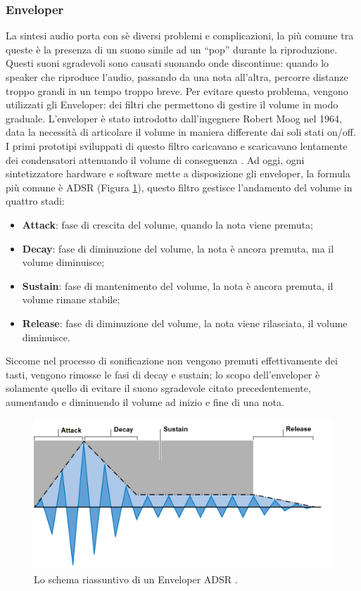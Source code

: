 \subsubsection{Enveloper}
La sintesi audio porta con sè diversi problemi e complicazioni, la più comune tra queste è la presenza di un suono simile ad un “pop” durante la riproduzione.
Questi suoni sgradevoli sono causati suonando onde discontinue: quando lo speaker che riproduce l'audio, passando da una nota all'altra, percorre distanze troppo grandi in un tempo troppo breve.
Per evitare questo problema, vengono utilizzati gli Enveloper: dei filtri che permettono di gestire il volume in modo graduale.
L'enveloper è stato introdotto dall'ingegnere Robert Moog nel 1964, data la necessità di articolare il volume in maniera differente dai soli stati on/off.
I primi prototipi sviluppati di questo filtro caricavano e scaricavano lentamente dei condensatori attenuando il volume di conseguenza \cite{enveloper}.
Ad oggi, ogni sintetizzatore hardware e software mette a disposizione gli enveloper, la formula più comune è ADSR (Figura \ref{fig:asdr}), questo filtro gestisce l'andamento del volume in quattro stadi:
\begin{itemize}
    \item \textbf{Attack}: fase di crescita del volume, quando la nota viene premuta;
    \item \textbf{Decay}: fase di diminuzione del volume, la nota è ancora premuta, ma il volume diminuisce;
    \item \textbf{Sustain}: fase di mantenimento del volume, la nota è ancora premuta, il volume rimane stabile;
    \item \textbf{Release}: fase di diminuzione del volume, la nota viene rilasciata, il volume diminuisce.  
\end{itemize}
Siccome nel processo di sonificazione non vengono premuti effettivamente dei tasti, vengono rimosse le fasi di decay e sustain;
lo scopo dell'enveloper è solamente quello di evitare il suono sgradevole citato precedentemente, aumentando e diminuendo il volume ad inizio e fine di una nota.
\begin{figure}[H]
    \includegraphics[width=\linewidth,scale=0.2]{img/adsr.PNG}
    \caption{Lo schema riassuntivo di un Enveloper ADSR \cite{env_img}.}
    \label{fig:asdr}
\end{figure}

